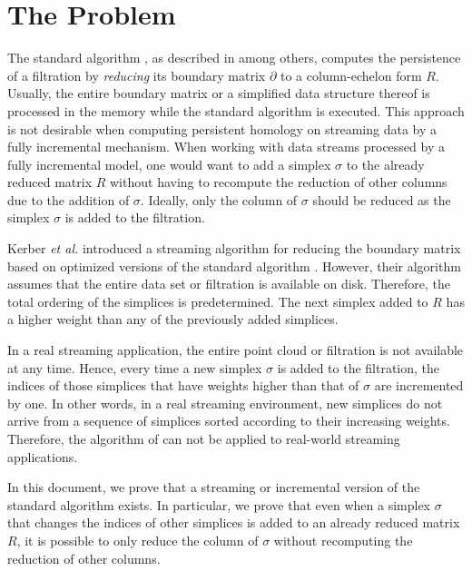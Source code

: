 \documentclass[11pt]{article}
\begin{document}
\section{The Problem}


The standard algorithm \cite{edelsbrunner-00, zomorodian-05}, as described in 
\cite{edelsbrunner-10, otter-17, chen-11, kerber-18} among others, computes the persistence of a 
filtration \cite{zomorodian-10} by \emph{reducing} its boundary matrix $\partial$ to a 
column-echelon form $R$.  Usually, the 
entire boundary matrix or a simplified data structure thereof is processed in the memory while the 
standard algorithm is executed.  This approach is not desirable when computing persistent homology 
on streaming data by a fully incremental mechanism.  When working with data streams processed by a 
fully incremental model, one would want to add a simplex $\sigma$ to the already reduced matrix $R$ 
without having to recompute the reduction of other columns due to the addition of $\sigma$.  
Ideally, only the column of $\sigma$ should be reduced as the simplex $\sigma$ is added to the 
filtration.




Kerber \textit{et al.} \cite{kerber-18} introduced a streaming algorithm for reducing the boundary 
matrix based on optimized versions of the standard algorithm \cite{edelsbrunner-00, 
zomorodian-05}.  However, their algorithm assumes that the entire data set or filtration is 
available on disk.  Therefore, the total ordering of the simplices is predetermined.  The next 
simplex added to $R$ has a higher weight than any of the previously added simplices.


In a real streaming application, the entire point cloud or filtration is not available at any 
time.  Hence, every time a new simplex $\sigma$ is added to the filtration, the indices of those 
simplices that have weights higher than that of $\sigma$ are incremented by one.  In other words, 
in a real streaming environment, new simplices do not arrive from a sequence of simplices sorted 
according to their increasing weights.  Therefore, the algorithm of \cite{kerber-18} can not be 
applied to real-world streaming applications.



In this document, we prove that a streaming or incremental version of the standard algorithm 
exists.  In particular, we prove that even when a simplex $\sigma$ that changes the 
indices of other simplices is added to an already reduced matrix $R$, it is possible to only reduce 
the column of $\sigma$ without recomputing the reduction of other columns.
\end{document}
